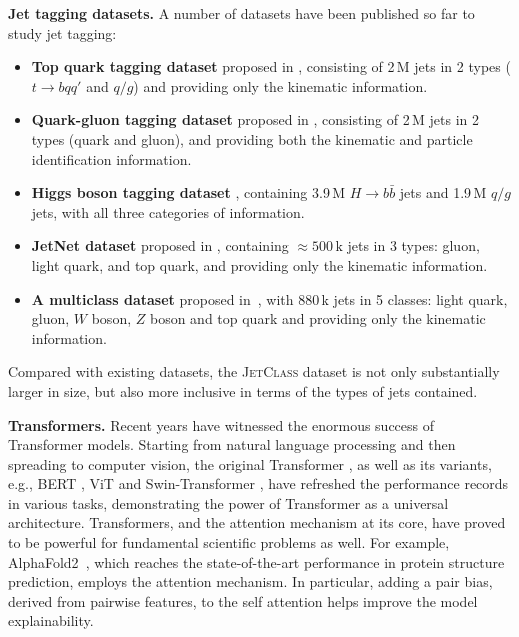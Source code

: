 \documentclass[nohyperref]{article}
\theoremstyle{plain}
\theoremstyle{definition}
\theoremstyle{remark}
\newcommand{\jetclass}{{\textsc{JetClass}}\xspace}
\newcommand{\hbb}{\ensuremath{H\to b \bar{b}}\xspace}
\newcommand{\tbqq}{\ensuremath{t\to b q q'}\xspace}
\newcommand{\qgj}{\ensuremath{q/g}\xspace}
\begin{document}
\textbf{Jet tagging datasets.}
A number of datasets have been published so far to study jet tagging:
\begin{itemize}
    \vspace{-.2cm}
    \item \textbf{Top quark tagging dataset} \cite{kasieczkaTopQuarkTagging2019} proposed in \citet{Kasieczka:2019dbj}, consisting of 2\,M jets in 2 types (\tbqq and \qgj) and providing only the kinematic information.
    \vspace{-.2cm}
    \item \textbf{Quark-gluon tagging dataset} \cite{komiskePythia8QuarkGluon2019} proposed in \citet{Komiske:2018cqr}, consisting of 2\,M jets in 2 types (quark and gluon), and providing both the kinematic and particle identification information.
    \vspace{-.2cm}
    \item \textbf{Higgs boson tagging dataset} \cite{duarteSampleJetTrack2019,chenFAIRAIreadyHiggs2021}, containing 3.9\,M \hbb jets and 1.9\,M \qgj jets, with all three categories of information.  
    \vspace{-.2cm}
    \item \textbf{JetNet dataset} \cite{kansal_raghav_2021_5502543} proposed in \citet{kansalParticleCloudGeneration2021}, containing ${\approx}500\,\mathrm{k}$ jets in 3 types: gluon, light quark, and top quark, and providing only the kinematic information.
    \vspace{-.2cm}
    \item \textbf{A multiclass dataset} \cite{pierini_maurizio_2020_3602260} proposed in~\citet{Moreno:2019bmu}, with 880\,k jets in 5 classes: light quark, gluon, $W$ boson, $Z$ boson and top quark and providing only the kinematic information.
    \vspace{-.2cm}
\end{itemize}
Compared with existing datasets, the \jetclass dataset is not only substantially larger in size, but also more inclusive in terms of the types of jets contained.

\textbf{Transformers.}
Recent years have witnessed the enormous success of Transformer models. Starting from natural language processing and then spreading to computer vision, the original Transformer \cite{vaswaniAttentionAllYou2017}, as well as its variants, e.g., BERT \cite{devlinBERTPretrainingDeep2019}, ViT \cite{dosovitskiy2021an} and Swin-Transformer \cite{Liu_2021_ICCV}, have refreshed the performance records in various tasks, demonstrating the power of Transformer as a universal architecture. 
Transformers, and the attention mechanism at its core, have proved to be powerful for fundamental scientific problems as well. For example, AlphaFold2~\cite{Jumper2021}, which reaches the state-of-the-art performance in protein structure prediction, employs the attention mechanism. In particular, adding a pair bias, derived from pairwise features, to the self attention helps improve the model explainability.
\end{document}
